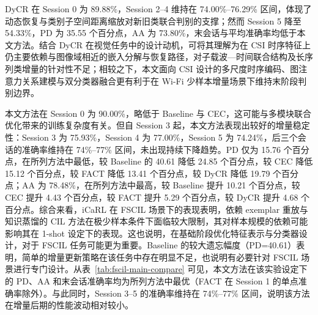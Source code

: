DyCR\cite{pan2025dycr} 在 Session 0 为 89.88\%，Session 2--4 维持在 74.00\%--76.29\% 区间，体现了动态恢复与类别子空间距离缩放对新旧类联合判别的支撑；然而 Session 5 降至 54.33\%，PD 为 35.55 个百分点，AA 为 73.80\%，末会话与平均准确率均低于本文方法。结合 DyCR 在视觉任务中的设计动机\cite{pan2025dycr}，可将其理解为在 CSI 时序特征上仍主要依赖与图像域相近的嵌入分解与恢复路径，对子载波—时间联合结构及长序列类增量的针对性不足；相较之下，本文面向 CSI 设计的多尺度时序编码、图注意力关系建模与双分类器融合更有利于在 Wi-Fi 少样本增量场景下维持末阶段判别边界。

本文方法在 Session 0 为 90.00\%，略低于 Baseline 与 CEC，这可能与多模块联合优化带来的训练复杂度有关。但自 Session 3 起，本文方法表现出较好的增量稳定性：Session 3 为 75.93\%，Session 4 为 77.00\%，Session 5 为 74.24\%，后三个会话的准确率维持在 74\%--77\% 区间，未出现持续下降趋势。PD 仅为 15.76 个百分点，在所列方法中最低，较 Baseline 的 40.61 降低 24.85 个百分点，较 CEC 降低 15.12 个百分点，较 FACT 降低 13.41 个百分点，较 DyCR 降低 19.79 个百分点；AA 为 78.48\%，在所列方法中最高，较 Baseline 提升 10.21 个百分点，较 CEC 提升 4.43 个百分点，较 FACT 提升 5.29 个百分点，较 DyCR 提升 4.68 个百分点。综合来看，iCaRL 在 FSCIL 场景下的表现表明，依赖 exemplar 重放与知识蒸馏的 CIL 方法在极少样本条件下面临较大限制，其对样本规模的依赖可能影响其在 1-shot 设定下的表现。这也说明，在基础阶段优化特征表示与分类器设计，对于 FSCIL 任务可能更为重要。Baseline 的较大遗忘幅度（PD=40.61）表明，简单的增量更新策略在该任务中存在明显不足，也说明有必要针对 FSCIL 场景进行专门设计。从表~\ref{tab:fscil-main-compare} 可见，本文方法在该实验设定下的 PD、AA 和末会话准确率均为所列方法中最优（FACT 在 Session 1 的单点准确率除外）。与此同时，Session 3--5 的准确率维持在 74\%--77\% 区间，说明该方法在增量后期的性能波动相对较小。

